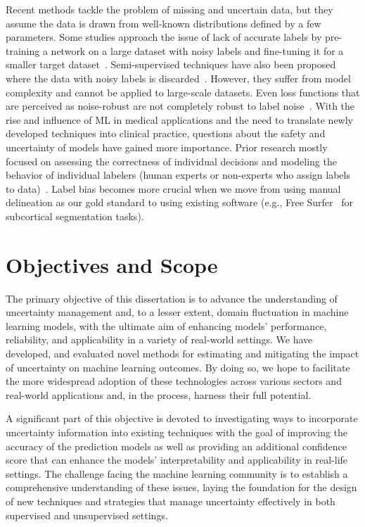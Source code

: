 Recent methods tackle the problem of missing and uncertain data, but they assume the data is drawn from well-known distributions defined by a few parameters. Some studies approach the issue of lack of accurate labels by pre-training a network on a large dataset with noisy labels and fine-tuning it for a smaller target dataset~\cite{oquab_Learning_2014}. Semi-supervised techniques have also been proposed where the data with noisy labels is discarded~\cite{zhu_Learning_2002}. However, they suffer from model complexity and cannot be applied to large-scale datasets. Even loss functions that are perceived as noise-robust are not completely robust to label noise~\cite{bartlett_Convexity_2006}. With the rise and influence of ML in medical applications and the need to translate newly developed techniques into clinical practice, questions about the safety and uncertainty of models have gained more importance. Prior research mostly focused on assessing the correctness of individual decisions and modeling the behavior of individual labelers (human experts or non-experts who assign labels to data)~\cite{raykar_Supervised_2009}. Label bias becomes more crucial when we move from using manual delineation as our gold standard to using existing software (e.g., Free Surfer~\cite{fischl_freesurfer_2012} for subcortical segmentation tasks).

\section{ Objectives and Scope}
The primary objective of this dissertation is to advance the understanding of uncertainty management and, to a lesser extent, domain fluctuation in machine learning models, with the ultimate aim of enhancing models' performance, reliability, and applicability in a variety of real-world settings. We have developed, and evaluated novel methods for estimating and mitigating the impact of uncertainty on machine learning outcomes. By doing so, we hope to facilitate the more widespread adoption of these technologies across various sectors and real-world applications and, in the process, harness their full potential.

A significant part of this objective is devoted to investigating ways to incorporate uncertainty information into existing techniques with the goal of improving the accuracy of the prediction models as well as providing an additional confidence score that can enhance the models' interpretability and applicability in real-life settings. The challenge facing the machine learning community is to establish a comprehensive understanding of these issues, laying the foundation for the design of new techniques and strategies that manage uncertainty effectively in both supervised and unsupervised settings.

